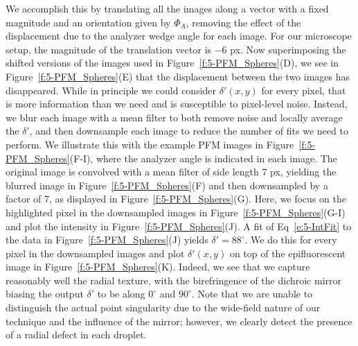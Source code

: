 We accomplish this by translating all the images along a vector with a fixed magnitude and an orientation given by $\Phi_A$, removing the effect of the displacement due to the analyzer wedge angle for each image.
For our microscope setup, the magnitude of the translation vector is $-6$ px.
Now superimposing the shifted versions of the images used in Figure~\ref{f:5-PFM_Spheres}(D), we see in Figure~\ref{f:5-PFM_Spheres}(E) that the displacement between the two images has disappeared.
While in principle we could consider $\delta'(x,y)$ for every pixel, that is more information than we need and is susceptible to pixel-level noise.
Instead, we blur each image with a mean filter to both remove noise and locally average the $\delta'$, and then downsample each image to reduce the number of fits we need to perform.
We illustrate this with the example PFM images in Figure~\ref{f:5-PFM_Spheres}(F-I), where the analyzer angle is indicated in each image.
The original image is convolved with a mean filter of side length 7 px, yielding the blurred image in Figure~\ref{f:5-PFM_Spheres}(F) and then downsampled by a factor of 7, as displayed in Figure~\ref{f:5-PFM_Spheres}(G).
Here, we focus on the highlighted pixel in the downsampled images in Figure~\ref{f:5-PFM_Spheres}(G-I) and plot the intensity in Figure~\ref{f:5-PFM_Spheres}(J).
A fit of Eq~\ref{e:5-IntFit} to the data in Figure~\ref{f:5-PFM_Spheres}(J) yields $\delta' = 88^{\circ}$.
We do this for every pixel in the downsampled images and plot $\delta'(x,y)$ on top of the epifluorescent image in Figure~\ref{f:5-PFM_Spheres}(K).
Indeed, we see that we capture reasonably well the radial texture, with the birefringence of the dichroic mirror biasing the output $\delta'$ to be along $0^{\circ}$ and $90^{\circ}$.
Note that we are unable to distinguish the actual point singularity due to the wide-field nature of our technique and the influence of the mirror; however, we clearly detect the presence of a radial defect in each droplet.

